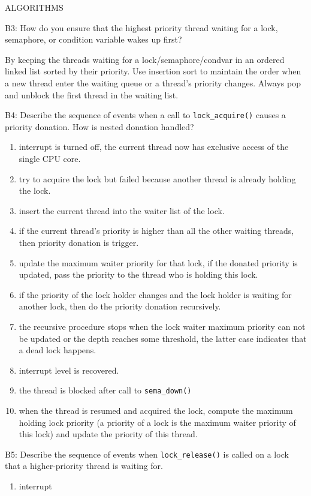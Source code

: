 \begin{aspect}{ALGORITHMS}
	\begin{qc}
		B3: How do you ensure that the highest priority thread waiting for a lock, semaphore, or condition variable wakes up first?
	\end{qc}

	By keeping the threads waiting for a lock/semaphore/condvar in an ordered linked list sorted by their priority.
	Use insertion sort to maintain the order when a new thread enter the waiting queue or a thread's priority changes.
	Always pop and unblock the first thread in the waiting list.

	\begin{qc}
		B4: Describe the sequence of events when a call to \lstinline{lock_acquire()} causes a priority donation.
		How is nested donation handled?
	\end{qc}

	\begin{enumerate}
		\item interrupt is turned off, the current thread now has exclusive access of the single CPU core.
		\item try to acquire the lock but failed because another thread is already holding the lock.
		\item insert the current thread into the waiter list of the lock.
		\item if the current thread's priority is higher than all the other waiting threads, then priority donation is trigger.
		\item update the maximum waiter priority for that lock, if the donated priority is updated,
		      pass the priority to the thread who is holding this lock.
		\item if the priority of the lock holder changes and the lock holder is waiting for another lock,
		      then do the priority donation recursively.
		\item the recursive procedure stops when the lock waiter maximum priority can not be updated or the depth reaches some threshold,
		      the latter case indicates that a dead lock happens.
		\item interrupt level is recovered.
		\item the thread is blocked after call to \lstinline{sema_down()}
		\item when the thread is resumed and acquired the lock,
		      compute the maximum holding lock priority (a priority of a lock is the maximum waiter priority of this lock) and update the priority of this thread.
	\end{enumerate}

	\begin{qc}
		B5: Describe the sequence of events when \lstinline{lock_release()} is called on a lock that a higher-priority thread is waiting for.
	\end{qc}

	\begin{enumerate}

		\item interrupt
	\end{enumerate}

\end{aspect}

